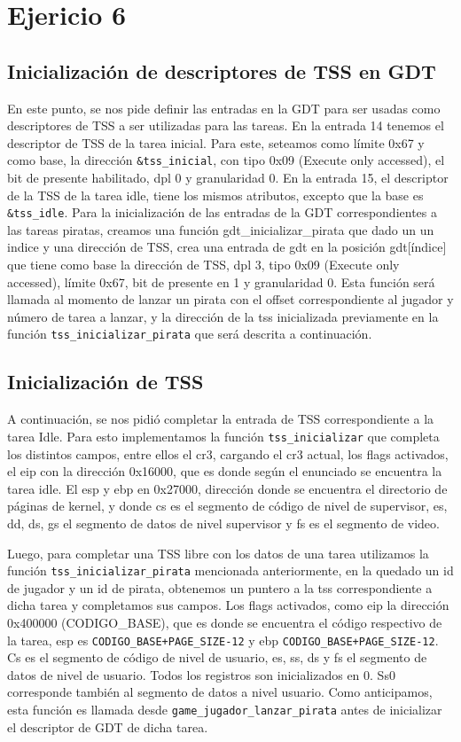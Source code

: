 \section{Ejericio 6}
\subsection{Inicialización de descriptores de TSS en GDT}

En este punto, se nos pide definir las entradas en la GDT para ser usadas como descriptores de TSS a ser utilizadas para las tareas.
En la entrada 14 tenemos el descriptor de TSS de la tarea inicial. Para este, seteamos como límite 0x67 y como base, la dirección \texttt{\&tss\_inicial}, con tipo 0x09 (Execute only accessed), el bit de presente habilitado, dpl 0 y granularidad 0.
En la entrada 15, el descriptor de la TSS de la tarea idle, tiene los mismos atributos, excepto que la base es \texttt{\&tss\_idle}.
Para la inicialización de las entradas de la GDT correspondientes a las tareas piratas, creamos una función gdt\_inicializar\_pirata que dado un un indice y una dirección de TSS, crea una entrada de gdt en la posición gdt[índice] que tiene como base la dirección de TSS, dpl 3, tipo 0x09 (Execute only accessed), límite 0x67, bit de presente en 1 y granularidad 0. Esta función será llamada al momento de lanzar un pirata con el offset correspondiente al jugador y número de tarea a lanzar, y la dirección de la tss inicializada previamente en la función \texttt{tss\_inicializar\_pirata} que será descrita a continuación.


\subsection{Inicialización de TSS}

A continuación, se nos pidió completar la entrada de TSS correspondiente a la tarea Idle. Para esto implementamos la función \texttt{tss\_inicializar} que completa los distintos campos, entre ellos el cr3, cargando el cr3 actual, los flags activados, el eip con la dirección 0x16000, que es donde según el enunciado se encuentra la tarea idle. El esp y ebp en 0x27000, dirección donde se encuentra el directorio de páginas de kernel, y donde cs es el segmento de código de nivel de supervisor, es, dd, ds, gs el segmento de datos de nivel supervisor y fs es el segmento de video.

Luego, para completar una TSS libre con los datos de una tarea utilizamos la función \texttt{tss\_inicializar\_pirata} mencionada anteriormente, en la quedado un id de jugador y un id de pirata, obtenemos un puntero a la tss correspondiente a dicha tarea y completamos sus campos. Los flags activados, como eip la dirección 0x400000 (CODIGO\_BASE), que es donde se encuentra el código respectivo de la tarea, esp es \texttt{CODIGO\_BASE+PAGE\_SIZE-12} y ebp \texttt{CODIGO\_BASE+PAGE\_SIZE-12}. Cs es el segmento de código de nivel de usuario, es, ss, ds y fs el segmento de datos de nivel de usuario. Todos los registros son inicializados en 0.
Ss0 corresponde también al segmento de datos a nivel usuario. Como anticipamos, esta función es llamada desde \texttt{game\_jugador\_lanzar\_pirata} antes de inicializar el descriptor de GDT de dicha tarea.

